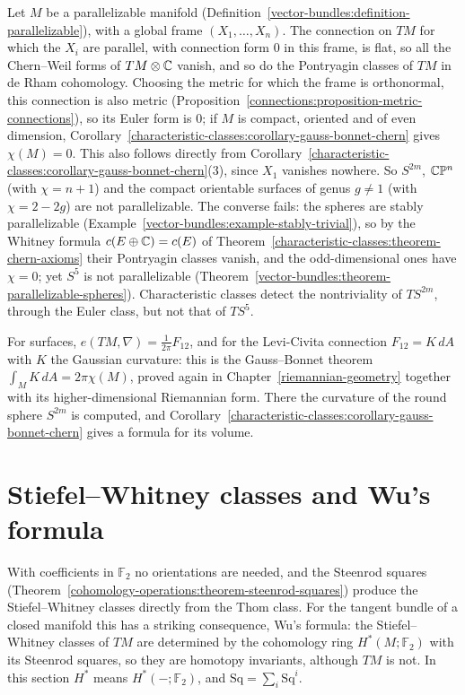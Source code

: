 \begin{example}\label{characteristic-classes:example-parallelizable}
Let $M$ be a parallelizable manifold (Definition~\ref{vector-bundles:definition-parallelizable}), with a global frame $(X_1, \ldots, X_n)$. The connection on $TM$ for which the $X_i$ are parallel, with connection form $0$ in
this frame, is flat, so all the Chern--Weil forms of $TM \otimes \mathbb{C}$ vanish, and so do the Pontryagin classes of $TM$ in de Rham cohomology. Choosing the metric for which the frame is orthonormal,
this connection is also metric (Proposition~\ref{connections:proposition-metric-connections}), so its Euler form is $0$; if $M$ is compact, oriented and of even dimension,
Corollary~\ref{characteristic-classes:corollary-gauss-bonnet-chern} gives $\chi(M) = 0$. This also follows directly from Corollary~\ref{characteristic-classes:corollary-gauss-bonnet-chern}(3), since $X_1$ vanishes
nowhere. So $S^{2m}$, $\mathbb{C}\mathbb{P}^n$ (with $\chi = n + 1$) and the compact orientable surfaces of genus $g \neq 1$ (with $\chi = 2 - 2g$) are not parallelizable. The converse fails: the spheres are stably
parallelizable (Example~\ref{vector-bundles:example-stably-trivial}), so by the Whitney formula $c(E \oplus \mathbb{C}) = c(E)$ of Theorem~\ref{characteristic-classes:theorem-chern-axioms} their Pontryagin classes
vanish, and the odd-dimensional ones have $\chi = 0$; yet $S^5$ is not parallelizable (Theorem~\ref{vector-bundles:theorem-parallelizable-spheres}). Characteristic classes detect the nontriviality of $TS^{2m}$,
through the Euler class, but not that of $TS^5$.
\end{example}

For surfaces, $e(TM, \nabla) = \frac{1}{2\pi}F_{12}$, and for the Levi-Civita connection $F_{12} = K\,dA$ with $K$ the Gaussian curvature: this is the Gauss--Bonnet theorem
$\int_MK\,dA = 2\pi\chi(M)$, proved again in Chapter~\ref{riemannian-geometry} together with its higher-dimensional Riemannian form. There the curvature of the round sphere $S^{2m}$ is
computed, and Corollary~\ref{characteristic-classes:corollary-gauss-bonnet-chern} gives a formula for its volume.

\section{Stiefel--Whitney classes and Wu's formula}\label{characteristic-classes:section-wu}

With coefficients in $\mathbb{F}_2$ no orientations are needed, and the Steenrod squares
(Theorem~\ref{cohomology-operations:theorem-steenrod-squares}) produce the Stiefel--Whitney classes directly from the Thom class. For the tangent
bundle of a closed manifold this has a striking consequence, Wu's formula: the Stiefel--Whitney classes of $TM$ are determined by the cohomology
ring $H^*(M; \mathbb{F}_2)$ with its Steenrod squares, so they are homotopy invariants, although $TM$ is not. In this section $H^*$ means
$H^*(-; \mathbb{F}_2)$, and $\mathrm{Sq} = \sum_i\mathrm{Sq}^i$.

